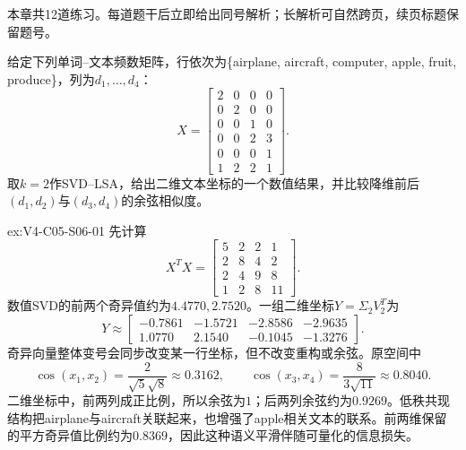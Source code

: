 \label{struct:V4-C05-CH34}
\begin{chapterexercisebox}
\label{struct:V4-C05-CH35}
本章共12道练习。每道题干后立即给出同号解析；长解析可自然跨页，续页标题保留题号。
\end{chapterexercisebox}

\begin{SLChapterExercisePairSection}

\begin{exercise}\label{ex:V4-C05-S06-01}
给定下列单词--文本频数矩阵，行依次为\{airplane, aircraft, computer, apple, fruit, produce\}，列为$d_1,\ldots,d_4$：
\[
X=\begin{bmatrix}
2&0&0&0\\0&2&0&0\\0&0&1&0\\0&0&2&3\\0&0&0&1\\1&2&2&1
\end{bmatrix}.
\]
取$k=2$作SVD--LSA，给出二维文本坐标的一个数值结果，并比较降维前后$(d_1,d_2)$与$(d_3,d_4)$的余弦相似度。
\end{exercise}
\ifSLFullEdition
{}\label{sol:V4-C05-S06-01}
\begin{chapterexercisesolution}{ex:V4-C05-S06-01}
先计算
\[
X^TX=\begin{bmatrix}
5&2&2&1\\2&8&4&2\\2&4&9&8\\1&2&8&11
\end{bmatrix}.
\]
数值SVD的前两个奇异值约为$4.4770,2.7520$。一组二维坐标$Y=\Sigma_2V_2^T$为
\[
Y\approx\begin{bmatrix}
-0.7861&-1.5721&-2.8586&-2.9635\\
 1.0770& 2.1540&-0.1045&-1.3276
\end{bmatrix}.
\]
奇异向量整体变号会同步改变某一行坐标，但不改变重构或余弦。原空间中
\[
\cos(x_1,x_2)=\frac{2}{\sqrt5\sqrt8}\approx0.3162,
\qquad
\cos(x_3,x_4)=\frac8{3\sqrt{11}}\approx0.8040.
\]
二维坐标中，前两列成正比例，所以余弦为$1$；后两列余弦约为$0.9269$。低秩共现结构把airplane与aircraft关联起来，也增强了apple相关文本的联系。前两维保留的平方奇异值比例约为$0.8369$，因此这种语义平滑伴随可量化的信息损失。
\end{chapterexercisesolution}
\fi


\end{SLChapterExercisePairSection}
